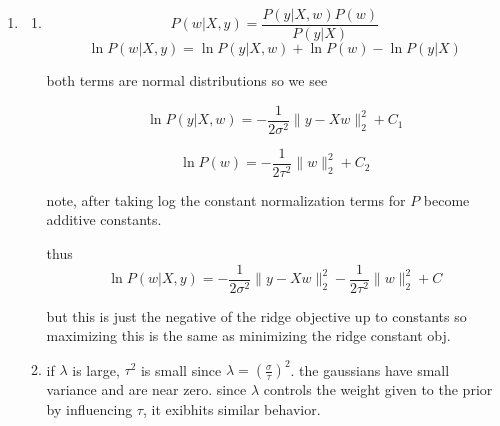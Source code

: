 \documentclass{article}
\begin{document}
\begin{enumerate}
\begin{enumerate}
        therefore 

        $$MSE_j = \left( \frac{\lambda w_j^*}{1+\lambda} \right)^2 + \frac{\sigma^2}{(1+\lambda)^2}$$

        to find optimal \(\lambda\), w wolfram alpha
        $$\frac{d}{d\lambda} MSE_j = \frac{2(\lambda (w_j^*)^2 - \sigma^2)}{(1+\lambda)^3}$$

        set \(\lambda\) to \(\frac{\sigma^2}{(w^*_j)^2}\) to make the numerator 0 and thus the whole term 0.

        OLS is bad when noise is high and good when noise is low. ridge is better when noise is high.
    \end{enumerate}
    \item 
    \begin{enumerate}
        \item $$P(w | X, y) = \frac{P(y | X, w) P(w)}{P(y | X)}$$
        $$\ln P(w | X, y) = \ln P(y | X, w) + \ln P(w) -\ln P(y|X)$$

        both terms are normal distributions so we see 

        $$\ln P(y | X, w) = -\frac{1}{2\sigma^2} \|y - Xw\|_2^2 + C_1$$

        $$\ln P(w) = -\frac{1}{2\tau^2} \|w\|_2^2 + C_2$$

        note, after taking log the constant normalization terms for \(P\) become additive constants.

        thus
        $$\ln P(w | X, y) = -\frac{1}{2\sigma^2} \|y - Xw\|_2^2 - \frac{1}{2\tau^2} \|w\|_2^2 + C$$

        but this is just the negative of the ridge objective up to constants so maximizing this is the same as minimizing the ridge constant obj.

        \item if \(\lambda\) is large, \(\tau^2\) is small since \(\lambda = \left( \frac{\sigma}{\tau} \right)^2\). the gaussians have small variance and are near zero. since \(\lambda\) controls the weight given to the prior by influencing \(\tau\), it exibhits similar behavior.
        
    \end{enumerate}




\end{enumerate}

\newpage
\end{document}
